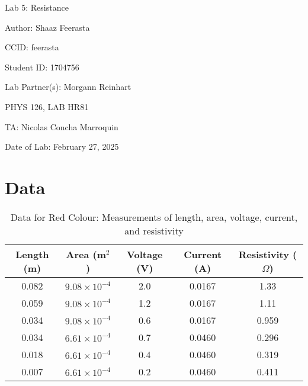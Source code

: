 \documentclass[12pt]{article}
\begin{document}
\pagebreak
\begin{titlepage}
    \begin{center}
        \vspace*{\fill}
        Lab 5: Resistance

        Author: Shaaz Feerasta

        CCID: feerasta

        Student ID: 1704756

        Lab Partner(s): Morgann Reinhart

        PHYS 126, LAB HR81

        TA: Nicolas Concha Marroquin

        Date of Lab: February 27, 2025
        \vspace*{\fill}
    \end{center}
\end{titlepage}

\section{Data}

\begin{table}[H]
\caption{Data for Red Colour: Measurements of length, area, voltage, current, and resistivity}
\centering
\begin{tabular}{|c|c|c|c|c|}
\hline
Length (m) & Area (m$^2$) & Voltage (V) & Current (A) & Resistivity ($\Omega$) \\ \hline
0.082   & $9.08 \times 10^{-4}$   & 2.0   & 0.0167  & 1.33 \\ \hline
0.059   & $9.08 \times 10^{-4}$   & 1.2   & 0.0167   & 1.11\\ \hline
0.034   & $9.08 \times 10^{-4}$   & 0.6   & 0.0167   & 0.959 \\ \hline
0.034   & $6.61 \times 10^{-4}$   & 0.7   & 0.0460   & 0.296 \\ \hline
0.018   & $6.61 \times 10^{-4}$   & 0.4   & 0.0460   & 0.319 \\ \hline
0.007   & $6.61 \times 10^{-4}$   & 0.2   & 0.0460   & 0.411 \\ \hline
\end{tabular}
\label{tab:red_data}
\end{table}
\end{document}
